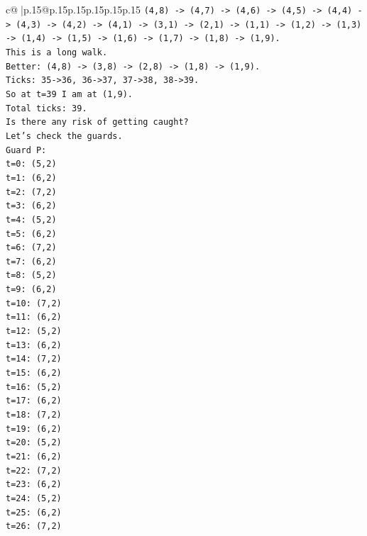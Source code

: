 \documentclass{article}
\begin{document}
{\begin{supertabular}{c@{$\;$}|p{.15\linewidth}@{}p{.15\linewidth}p{.15\linewidth}p{.15\linewidth}p{.15\linewidth}p{.15\linewidth}}
{{{\texttt{(4,8) {-}> (4,7) {-}> (4,6) {-}> (4,5) {-}> (4,4) {-}> (4,3) {-}> (4,2) {-}> (4,1) {-}> (3,1) {-}> (2,1) {-}> (1,1) {-}> (1,2) {-}> (1,3) {-}> (1,4) {-}> (1,5) {-}> (1,6) {-}> (1,7) {-}> (1,8) {-}> (1,9).} \\
\texttt{This is a long walk.} \\
\texttt{Better: (4,8) {-}> (3,8) {-}> (2,8) {-}> (1,8) {-}> (1,9).} \\
\texttt{Ticks: 35{-}>36, 36{-}>37, 37{-}>38, 38{-}>39.} \\
\texttt{So at t=39 I am at (1,9).} \\
\texttt{Total ticks: 39.} \\
\texttt{Is there any risk of getting caught?} \\
\texttt{Let's check the guards.} \\
\texttt{Guard P:} \\
\texttt{t=0: (5,2)} \\
\texttt{t=1: (6,2)} \\
\texttt{t=2: (7,2)} \\
\texttt{t=3: (6,2)} \\
\texttt{t=4: (5,2)} \\
\texttt{t=5: (6,2)} \\
\texttt{t=6: (7,2)} \\
\texttt{t=7: (6,2)} \\
\texttt{t=8: (5,2)} \\
\texttt{t=9: (6,2)} \\
\texttt{t=10: (7,2)} \\
\texttt{t=11: (6,2)} \\
\texttt{t=12: (5,2)} \\
\texttt{t=13: (6,2)} \\
\texttt{t=14: (7,2)} \\
\texttt{t=15: (6,2)} \\
\texttt{t=16: (5,2)} \\
\texttt{t=17: (6,2)} \\
\texttt{t=18: (7,2)} \\
\texttt{t=19: (6,2)} \\
\texttt{t=20: (5,2)} \\
\texttt{t=21: (6,2)} \\
\texttt{t=22: (7,2)} \\
\texttt{t=23: (6,2)} \\
\texttt{t=24: (5,2)} \\
\texttt{t=25: (6,2)} \\
\texttt{t=26: (7,2)} \\
}}}
\end{supertabular}}
\end{document}
